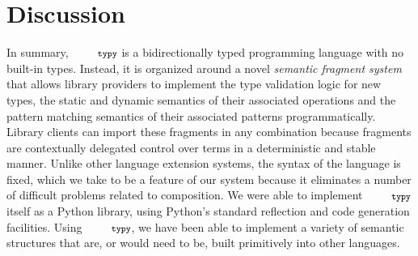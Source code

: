 \documentclass[10pt]{sigplanconf}
\newcommand{\typy}{\texttt{\footnotesize typy}}
\begin{document}
\section{Discussion}\label{sec:discussion}
In summary, $\typy$ is a bidirectionally typed programming language with no built-in types. Instead, it is organized around a novel \emph{semantic fragment system} that allows library providers to implement the type validation logic for new types, the static and dynamic semantics of their associated operations and the pattern matching semantics of their associated patterns programmatically. Library clients can import these fragments in any combination because fragments are contextually delegated control over terms in a deterministic and stable manner. Unlike other language extension systems, the syntax of the language is fixed, which we take to be a feature of our system because it eliminates a number of difficult problems related to composition.  We were able to implement $\typy$ itself as a Python library, using Python's standard reflection and code generation facilities. Using $\typy$, we have been able to implement a variety of semantic structures that are, or would need to be, built primitively into other languages.


\end{document}
